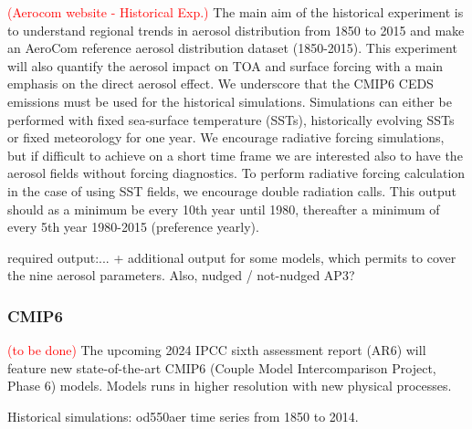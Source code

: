 \documentclass[journal abbreviation, manuscript]{copernicus}
\begin{document}
\textcolor{red}{(Aerocom website - Historical Exp.)} The main aim of the historical experiment is to understand regional trends in aerosol distribution from 1850 to 2015 and make an AeroCom reference aerosol distribution dataset (1850-2015). This experiment will also quantify the aerosol impact on TOA and surface forcing with a main emphasis on the direct aerosol effect. We underscore that the CMIP6 CEDS emissions must be used for the historical simulations. Simulations can either be performed with fixed sea-surface temperature (SSTs), historically evolving SSTs or fixed meteorology for one year. We encourage radiative forcing simulations, but if difficult to achieve on a short time frame we are interested also to have the aerosol fields without forcing diagnostics. To perform radiative forcing calculation in the case of using SST fields, we encourage double radiation calls. This output should as a minimum be every 10th year until 1980, thereafter a minimum of every 5th year 1980-2015 (preference yearly).

required output:... + additional output for some models, which permits to cover the nine aerosol parameters.
Also, nudged / not-nudged AP3?

\subsubsection{CMIP6}
\textcolor{red}{(to be done)}
The upcoming 2024 IPCC sixth assessment report (AR6) will feature new state-of-the-art CMIP6 (Couple Model Intercomparison Project, Phase 6) models. Models runs in higher resolution with new physical processes.

Historical simulations: od550aer time series from 1850 to 2014.
\end{document}
